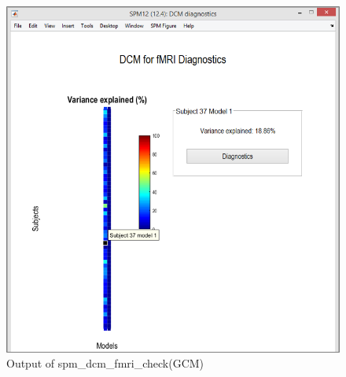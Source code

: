 \documentclass{article}
\begin{document}
\begin{figure}[ht]
\begin{center}
\includegraphics{"Fig_spm_dcm_fmri_check_part1"}
\caption{Output of spm\_dcm\_fmri\_check(GCM) \label{Fig_spm_dcm_fmri_check_part1}}
\end{center}
\end{figure}
\end{document}
